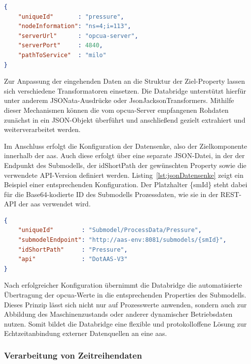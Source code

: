 \begin{lstlisting}[language=json, caption={Beispielhafte JSON-Konfiguration einer Datenquelle}, label={lst:jsonDatenquelle}]
{
    "uniqueId"       : "pressure",
    "nodeInformation": "ns=4;i=113",
    "serverUrl"      : "opcua-server",
    "serverPort"     : 4840,
    "pathToService"  : "milo"
}
\end{lstlisting}

Zur Anpassung der eingehenden Daten an die Struktur der Ziel-Property lassen sich verschiedene Transformatoren einsetzen.
Die Databridge unterstützt hierfür unter anderem JSONata-Ausdrücke oder JsonJacksonTransformers.
Mithilfe dieser Mechanismen können die vom \acs{opcua}-Server empfangenen Rohdaten zunächst in ein JSON-Objekt überführt und anschließend gezielt extrahiert und weiterverarbeitet werden.

Im Anschluss erfolgt die Konfiguration der Datensenke, also der Zielkomponente innerhalb der \acs{aas}.
Auch diese erfolgt über eine separate JSON-Datei, in der der Endpunkt des Submodells, der idShortPath der gewünschten Property sowie die verwendete API-Version definiert werden.
Listing~\ref{lst:jsonDatensenke} zeigt ein Beispiel einer entsprechenden Konfiguration.
Der Platzhalter \{smId\} steht dabei für die Base64-kodierte ID des Submodells Prozessdaten, wie sie in der REST-API der \acs{aas} verwendet wird.
\begin{lstlisting}[language=json, caption={Beispielhafte JSON-Konfiguration einer Datensenke}, label={lst:jsonDatensenke}]
{
    "uniqueId"        : "Submodel/ProcessData/Pressure",
    "submodelEndpoint": "http://aas-env:8081/submodels/{smId}",
    "idShortPath"     : "Pressure",
    "api"             : "DotAAS-V3"
}
\end{lstlisting}

Nach erfolgreicher Konfiguration übernimmt die Databridge die automatisierte Übertragung der \acs{opcua}-Werte in die entsprechenden Properties des Submodells.
Dieses Prinzip lässt sich nicht nur auf Prozesswerte anwenden, sondern auch zur Abbildung des Maschinenzustands oder anderer dynamischer Betriebsdaten nutzen.
Somit bildet die Databridge eine flexible und protokolloffene Lösung zur Echtzeitanbindung externer Datenquellen an eine \acs{aas}.


\subsubsection{Verarbeitung von Zeitreihendaten}

